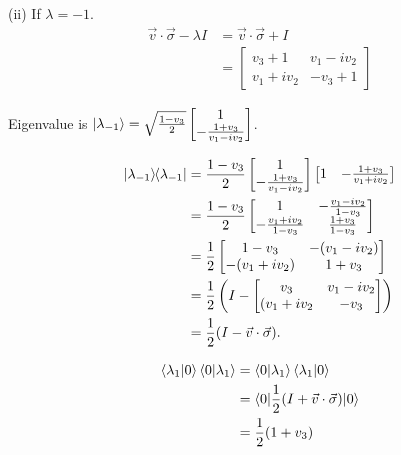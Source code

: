 (ii) If $\lambda = -1$.
\begin{align*}
	\vec{v} \cdot \vec{\sigma}  - \lambda I &= \vec{v} \cdot \vec{\sigma}  + I\\	
	&= \begin{bmatrix}
		v_3 + 1 & v_1 - i v_2 \\ 
		v_1 + i v_2 & - v_3 + 1
	\end{bmatrix}
\end{align*}

Eigenvalue is $\ket{\lambda_{-1}} = \sqrt{ \frac{1-v_3}{2 }} \begin{bmatrix}
1 \\ 
- \frac{1+v_3}{v_1 - iv_2}
\end{bmatrix} $.


\begin{align*}
	\ket{\lambda_{-1}}\hspace{-1mm} \bra{\lambda_{-1}} &= \frac{1 - v_3}{2} \begin{bmatrix}
	1 \\ 
	- \frac{1+v_3}{v_1 - iv_2}
	\end{bmatrix}
	\begin{bmatrix}
		1 & - \frac{1+v_3}{v_1 + iv_2}
	\end{bmatrix}\\
	&=
	\frac{1 - v_3}{2} \begin{bmatrix}
		1 & - \frac{v_1 - iv_2}{1 - v_3} \\ 
		- \frac{v_1 + iv_2}{1 - v_3} & \frac{1+v_3}{1 - v_3}
	\end{bmatrix} \\
	&=
	\frac{1}{2} \begin{bmatrix}
		1 - v_3 & -(v_1 - iv_2) \\ 
		- (v_1 + iv_2) & 1 + v_3
	\end{bmatrix} \\
	&=
	\frac{1}{2} \left( I - \begin{bmatrix}
		v_3 & v_1 - iv_2 \\ 
		(v_1 + iv_2 & - v_3
	\end{bmatrix} \right)\\
	&= \frac{1}{2} (I - \vec{v} \cdot \vec{\sigma} ).
\end{align*}



\begin{align*}
	\braket{\lambda_1 | 0} \braket{0 | \lambda_1} &= \braket{0 | \lambda_1} \braket{\lambda_1 | 0}\\
		&= \braket{0 | \frac{1}{2} ( I + \vec{v} \cdot \vec{\sigma} ) | 0}\\
		&= \frac{1}{2} (1 + v_3)
\end{align*}

